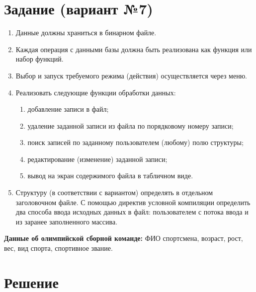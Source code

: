 \documentclass[12pt]{article}
\begin{document}
\section*{Задание (вариант №7)}
\begin{enumerate}
\item Данные должны храниться в бинарном файле.
\item Каждая операция с данными базы должна быть реализована как функция или набор
функций.
\item Выбор и запуск требуемого режима (действия) осуществляется через меню.
\item Реализовать следующие функции обработки данных:
\begin{enumerate}
\item добавление записи в файл;
\item удаление заданной записи из файла по порядковому номеру записи;
\item поиск записей по заданному пользователем (любому) полю структуры;
\item редактирование (изменение) заданной записи;
\item вывод на экран содержимого файла в табличном виде.
\end{enumerate}
\item Структуру (в соответствии с вариантом) определять в отдельном заголовочном файле. С
помощью директив условной компиляции определить два способа ввода исходных данных в
файл: пользователем с потока ввода и из заранее заполненного массива.
\end{enumerate}

\textbf{Данные об олимпийской сборной команде:} ФИО спортсмена, возраст, рост, вес, вид спорта,
спортивное звание.

\newpage


\section*{Решение}
\end{document}
